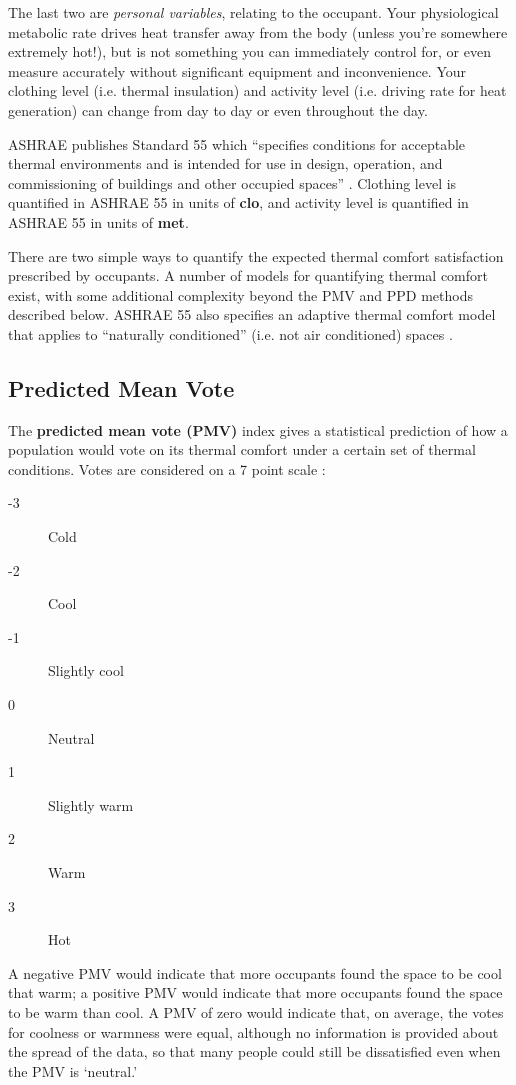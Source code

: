 \documentclass[10pt]{article}
\begin{document}
The last two are \textit{personal variables}, relating to the occupant.
Your physiological metabolic rate drives heat transfer away from the body (unless you're somewhere extremely hot!), but is not something you can immediately control for, or even measure accurately without significant equipment and inconvenience. Your clothing level (i.e. thermal insulation) and activity level (i.e. driving rate for heat generation) can change from day to day or even throughout the day.

ASHRAE publishes Standard 55 which ``specifies conditions for acceptable thermal environments and is intended for use in design, operation, and commissioning of buildings and other occupied spaces'' \cite{noauthor_undated-wv}. Clothing level is quantified in ASHRAE 55 in units of \textbf{clo}, and activity level is quantified in ASHRAE 55 in units of \textbf{met}.

There are two simple ways to quantify the expected thermal comfort satisfaction prescribed by occupants. A number of models for quantifying thermal comfort exist, with some additional complexity beyond the PMV and PPD methods described below. ASHRAE 55 also specifies an adaptive thermal comfort model that applies to ``naturally conditioned'' (i.e. not air conditioned) spaces \cite{noauthor_undated-wv}.

\subsection{Predicted Mean Vote}

The \textbf{predicted mean vote (PMV)} index gives a statistical prediction of how a population would vote on its thermal comfort under a certain set of thermal conditions. Votes are considered on a 7 point scale \cite{noauthor_undated-wv}:

\begin{description}
\item[-3] Cold
\item[-2] Cool
\item[-1] Slightly cool
\item[0] Neutral
\item[1] Slightly warm
\item[2] Warm
\item[3] Hot
\end{description}

A negative PMV would indicate that more occupants found the space to be cool that warm; a positive PMV would indicate that more occupants found the space to be warm than cool. A PMV of zero would indicate that, on average, the votes for coolness or warmness were equal, although no information is provided about the spread of the data, so that many people could still be dissatisfied even when the PMV is `neutral.'
\end{document}
